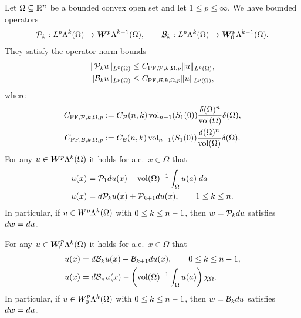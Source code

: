 \documentclass[10pt,a4paper]{article}
\begin{document}
\begin{theorem}\label{theorem:bogovpoinc}
    Let $\Omega \subseteq {\mathbb R}^{n}$ be a bounded convex open set and let $1 \leq p \leq \infty$. 
    We have bounded operators 
    \begin{align*}
        {\mathcal P}_{k} : L^{p}\Lambda^{k}(\Omega) \rightarrow \bm{W}^{p}\Lambda^{k-1}(\Omega)
        ,
        \qquad 
        {\mathcal B}_{k} : L^{p}\Lambda^{k}(\Omega) \rightarrow \bm{W}^{p}_{0}\Lambda^{k-1}(\Omega)
        .
    \end{align*}
    They satisfy the operator norm bounds 
    \begin{align*}
        \| {\mathcal P}_{k} u \|_{L^{p}(\Omega)}
        &\leq 
        C_{{{\rm PF}},{\mathcal P},k,\Omega,p}
        \| u \|_{L^{p}(\Omega)}
        ,
        \\
        \| {\mathcal B}_{k} u \|_{L^{p}(\Omega)}
        &\leq 
        C_{{{\rm PF}},{\mathcal B},k,\Omega,p}
        \| u \|_{L^{p}(\Omega)}
        ,
    \end{align*}
    where 
    \begin{align}
        C_{{{\rm PF}},{\mathcal P},k,\Omega,p} &:= C_{{\mathcal P}}(n,k) \operatorname{vol}_{n-1}(S_{1}(0)) \frac{{\delta}(\Omega)^{n}}{\operatorname{vol}(\Omega)} {\delta}(\Omega)
        ,
        \\
        C_{{{\rm PF}},{\mathcal B},k,\Omega,p} &:= C_{{\mathcal B}}(n,k) \operatorname{vol}_{n-1}(S_{1}(0)) \frac{{\delta}(\Omega)^{n}}{\operatorname{vol}(\Omega)} {\delta}(\Omega)
        .
    \end{align}
    For any $u \in \bm{W}^{p}\Lambda^{k}(\Omega)$ it holds for a.e.\ $x \in \Omega$ that 
    \begin{align}
        u(x) &= {\mathcal P}_{1} d u(x) - \operatorname{vol}(\Omega)^{-1} \int_\Omega u(a) \;da
        \label{math:theorem:bogovpoinc:poincare:zero}
        \\
        u(x) &= d {\mathcal P}_{k} u(x) + {\mathcal P}_{k+1} d u(x), \qquad 1 \leq k \leq n.
        \label{math:theorem:bogovpoinc:poincare:k}    
    \end{align}
    In particular, if $u \in W^{p}    \Lambda^{k}(\Omega)$ with $0 \leq k \leq n-1$, then $w = {\mathcal P}_{k} d u$ satisfies $d w = d u$.
    
    For any $u \in \bm{W}^{p}_{0}\Lambda^{k}(\Omega)$ it holds for a.e.\ $x \in \Omega$ that 
    \begin{align}
        u(x) &= d {\mathcal B}_{k} u(x) + {\mathcal B}_{k+1} d u(x), \qquad 0 \leq k \leq n-1,
        \label{math:theorem:bogovpoinc:bogov:k}
        \\
        u(x) &= d {\mathcal B}_{n} u(x) - \left( \operatorname{vol}(\Omega)^{-1} \int_{\Omega} u(a) \right) \chi_{\Omega}.
        \label{math:theorem:bogovpoinc:bogov:n}
    \end{align}
    In particular, if $u \in W^{p}_{0}\Lambda^{k}(\Omega)$ with $0 \leq k \leq n-1$, then $w = {\mathcal B}_{k} d u$ satisfies $d w = d u$.
    

\end{theorem}
\end{document}
